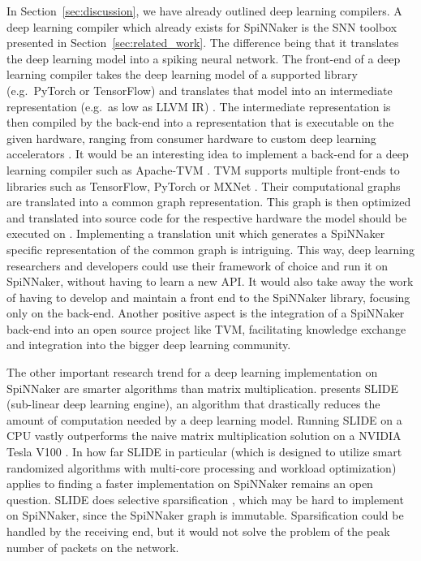 \documentclass[]{article}
\begin{document}
In Section~\ref{sec:discussion}, we have already outlined deep
learning compilers.
A deep learning compiler which already exists for SpiNNaker is the
SNN toolbox presented in Section~\ref{sec:related_work}.
The difference being that it translates the deep learning model into
a spiking neural network.
The front-end of a deep learning compiler takes the deep learning
model of a supported library (e.g.\ PyTorch or TensorFlow) and
translates that model into an intermediate representation (e.g.\
as low as LLVM IR) \citep{li_et_al_2020}.
The intermediate representation is then compiled by the back-end into
a representation that is executable on the given hardware, ranging
from consumer hardware to custom deep learning accelerators
\citep{li_et_al_2020}.
It would be an interesting idea to implement a back-end for a
deep learning compiler such as Apache-TVM \citep{chen_et_al_2018}.
TVM supports multiple front-ends to libraries such as TensorFlow,
PyTorch or MXNet \citep{chen_et_al_2015, chen_et_al_2018}.
Their computational graphs are translated into a common graph
representation.
This graph is then optimized and translated into source code for
the respective hardware the model should be executed on
\citep{chen_et_al_2018}.
Implementing a translation unit which generates a SpiNNaker specific
representation of the common graph is intriguing.
This way, deep learning researchers and developers could use their
framework of choice and run it on SpiNNaker, without having to
learn a new API.
It would also take away the work of having to develop and maintain
a front end to the SpiNNaker library, focusing only on the back-end.
Another positive aspect is the integration of a SpiNNaker back-end
into an open source project like TVM, facilitating knowledge exchange
and integration into the bigger deep learning community.

The other important research trend for a deep learning implementation
on  SpiNNaker are smarter algorithms than matrix multiplication.
\citet{chen_et_al_2019} presents SLIDE (sub-linear deep learning
engine), an algorithm that drastically reduces the amount of
computation needed by a deep learning model.
Running SLIDE on a CPU vastly outperforms the naive matrix
multiplication solution on a NVIDIA Tesla V100
\citep{chen_et_al_2019}.
In how far SLIDE in particular (which is designed to utilize smart
randomized algorithms with multi-core processing and workload
optimization) applies to finding a faster implementation on SpiNNaker
remains an open question.
SLIDE does selective sparsification
\citep{chen_et_al_2019, blanc_et_al_2018}, which may be hard to
implement on SpiNNaker, since the SpiNNaker graph is immutable.
Sparsification could be handled by the receiving end, but it would
not solve the problem of the peak number of packets on the
network.
\end{document}
